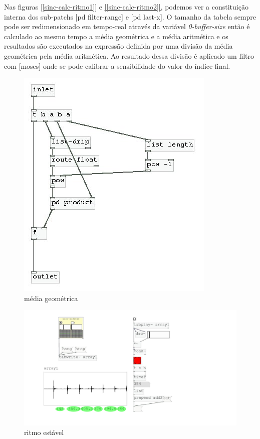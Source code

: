 \documentclass{ppgmus}
\begin{document}
Nas figuras \ref{[sinc-calc-ritmo1]} e \ref{[sinc-calc-ritmo2]}, podemos
ver a constituição interna dos sub-patchs [pd filter-range] e [pd last-x].
O tamanho da tabela sempre pode ser redimensionado em tempo-real através
da variável \textit{0-buffer-size} então é calculado ao mesmo tempo a média geométrica
e a média aritmética e os resultados são executados na expressão definida por uma
divisão da média geométrica pela média aritmética. %
Ao resultado dessa divisão é aplicado um filtro com [moses] onde se pode calibrar
a sensibilidade do valor do índice final.




\begin{figure}
\includegraphics[scale=.6]{sinc-calc-ritmo3}
\caption{média geométrica}
\label{[sinc-calc-ritmo3]}
\end{figure}

\begin{figure}
\includegraphics[scale=.4]{ex-ritmo1}
\caption{ritmo estável}
\label{ex-ritmo1}
\end{figure}
\end{document}
